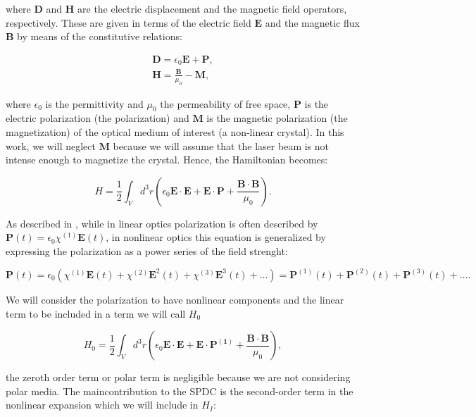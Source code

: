 \documentclass[12pt]{book}
\begin{document}
where $\textbf{D}$ and $\textbf{H}$ are the electric displacement and the magnetic field operators, respectively. These are given in terms of the electric field $\textbf{E}$ and the magnetic flux $\textbf{B}$ by means of the constitutive relations:


\begin{align}
\textbf{D}= \epsilon_{0} \textbf{E}+\textbf{P},\\
\textbf{H}=\frac{\textbf{B}}{\mu_{0}}-\textbf{M},
\end{align}

where $\epsilon_{0} $ is the permittivity and $\mu_{0}$ the permeability of free space, $\mathbf{P}$ is the electric polarization (the polarization) and $\mathbf{M}$ is the magnetic polarization (the magnetization) of the optical medium of interest (a non-linear crystal). In this work, we will neglect $\textbf{M}$ because we will assume that the laser beam is not intense enough to magnetize the crystal. Hence, the Hamiltonian becomes:

\begin{equation}
H=\frac{1}{2}\int_{V} d^{3}r \left(\epsilon_{0}\mathbf{E \cdot E}+\mathbf{E \cdot P}+\frac{\mathbf{B \cdot B}}{\mu_{0}} \right).
\end{equation}


As described in \cite{boyd}, while in linear optics polarization is often described by $\mathbf{P}(t)=\epsilon_{0} \chi^{(1)}\mathbf{E}(t)$, in nonlinear optics this equation is generalized by expressing the polarization as a power series of the field strenght:

\begin{equation}
\mathbf{P}(t)=\epsilon_{0} \left( \chi^{(1)}\mathbf{E}(t)+\chi^{(2)}\mathbf{E}^{2}(t)+\chi^{(3)}\mathbf{E}^{3}(t)+ \dots \right)=\mathbf{P}^{(1)}(t)+\mathbf{P}^{(2)}(t)+\mathbf{P}^{(3)}(t)+ \dots .
\end{equation}

 We will consider the polarization to have nonlinear components and the linear term to be included in a term we will call $H_{0}$
 
\begin{equation}
 H_{0}=\frac{1}{2}\int_{V} d^{3}r \left(\epsilon_{0}\mathbf{E \cdot E}+\mathbf{E} \cdot \mathbf{P^{(1)}}+\frac{\mathbf{B \cdot B}}{\mu_{0}} \right),
\end{equation}

  the zeroth order term or polar term is negligible because we are not considering polar media. The maincontribution to the SPDC is the second-order term in the nonlinear expansion which we will include in $H_{I}$:
\end{document}
